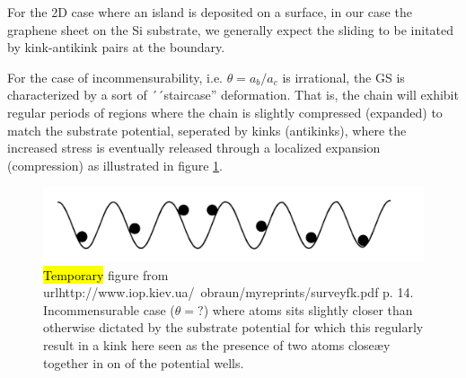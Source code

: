For the 2D case where an island is deposited on a surface, in our case the graphene sheet on the Si substrate, we generally expect the sliding to be initated by kink-antikink pairs at the boundary. 


For the case of incommensurability, i.e. $\theta = a_b/a_c$ is irrational, the
GS is characterized by a sort of ´´staircase'' deformation. That is, the chain
will exhibit regular periods of regions where the chain is slightly compressed
(expanded) to match the substrate potential, seperated by kinks (antikinks),
where the increased stress is eventually released through a localized expansion
(compression) as illustrated in figure \ref{fig:incommensurable_example}.

\begin{figure}[H]
  \centering
  \includegraphics[width=0.5\linewidth]{figures/theory/incommensurable_example.png}
  \caption{\hl{Temporary} figure from
  url{http://www.iop.kiev.ua/~obraun/myreprints/surveyfk.pdf} p. 14.
  Incommensurable case ($\theta = ?$) where atoms sits slightly closer than
  otherwise dictated by the substrate potential for which this regularly result
  in a kink here seen as the presence of two atoms closeæy together in on of the
  potential wells.}
  \label{fig:incommensurable_example}
\end{figure}


